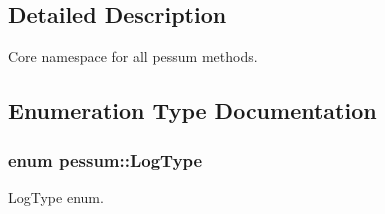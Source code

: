\subsection{Detailed Description}
Core namespace for all pessum methods. 

\subsection{Enumeration Type Documentation}
\subsubsection[{\texorpdfstring{Log\+Type}{LogType}}]{\setlength{\rightskip}{0pt plus 5cm}enum {\bf pessum\+::\+Log\+Type}}\hypertarget{namespacepessum_a0e205f64abc046e94dd38be906430664}{}\label{namespacepessum_a0e205f64abc046e94dd38be906430664}


Log\+Type enum. 

